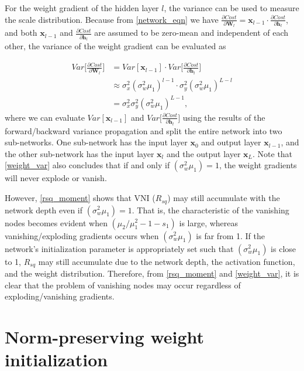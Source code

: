 For the weight gradient of the hidden layer $l$, the variance can be used to measure the scale distribution.
Because from \eqref{network_eqn} we have $\frac{\partial Cost}{\partial \mathbf{W}_l}
=\mathbf{x}_{l-1}\cdot\frac{\partial Cost}{\partial \mathbf{h}_l}$, and both $\mathbf{x}_{l-1}$ and $\frac{\partial Cost}{\partial \mathbf{h}_l}$ are assumed to be zero-mean and independent of each other, the variance of the weight gradient can be evaluated as

\begin{equation}
    \begin{aligned}
    Var\Big[\frac{\partial Cost}{\partial \mathbf{W}_l}\Big]
    &=
    Var[\mathbf{x}_{l-1}]\cdot
    Var\Big[\frac{\partial Cost}{\partial \mathbf{h}_l}\Big]\\
    &
    \approx
    \sigma_x^2(\sigma_w^2\mu_1)^{l-1}\cdot
    \sigma_y^2(\sigma_w^2\mu_1)^{L-l}\\
    &=
    \sigma_x^2\sigma_y^2(\sigma_w^2\mu_1)^{L-1},
    \end{aligned}
    \label{weight_var}
\end{equation}
where we can evaluate $Var[\mathbf{x}_{l-1}]$ and $Var\Big[\frac{\partial Cost}{\partial \mathbf{h}_l}\Big]$ using the results of the forward/backward variance propagation and split the entire network into two sub-networks. One sub-network has the input layer $\mathbf{x}_{0}$ and output layer $\mathbf{x}_{l-1}$, and the other sub-network has the input layer $\mathbf{x}_{l}$ and the output layer $\mathbf{x}_{L}$. Note that \eqref{weight_var} also concludes that if and only if $(\sigma_w^2\mu_1)=1$, the weight gradients will never explode or vanish.

However, \eqref{rsq_moment} shows that VNI ($R_{sq}$) may still accumulate with the network depth even
if $(\sigma_w^2\mu_1)=1$. That is, the characteristic of the vanishing nodes becomes evident 
when $(\mu_2/\mu_1^2-1-s_1)$ is large, whereas vanishing/exploding gradients occurs when
$(\sigma_w^2\mu_1)$ is far from 1. If the network's initialization parameter is appropriately set such
that $(\sigma_w^2\mu_1)$ is close to 1, $R_{sq}$ may still accumulate due to the network depth, the
activation function, and the weight distribution. Therefore, from \eqref{rsq_moment} and
\eqref{weight_var}, it is clear that the problem of vanishing nodes may occur regardless of 
exploding/vanishing gradients.

\section{Norm-preserving weight initialization} \label{comp:init}

